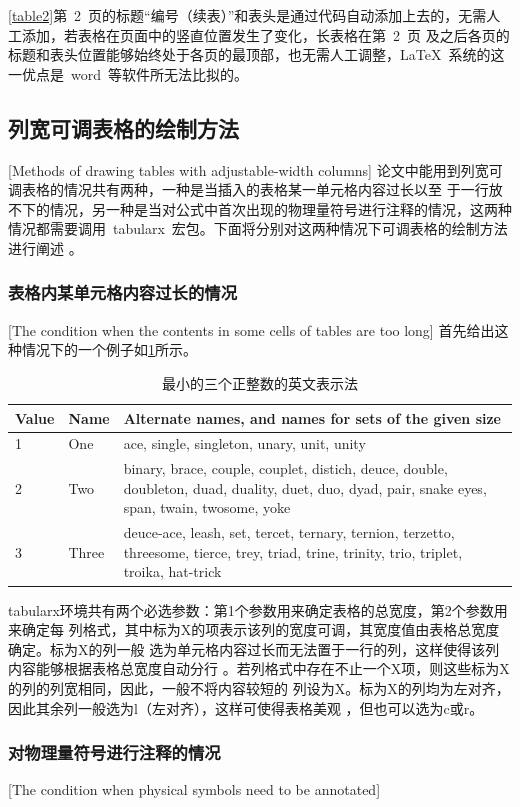 \cref{table2}第~2~页的标题“编号（续表）”和表头是通过代码自动添加上去的，无需人工添加，若表格在页面中的竖直位置发生了变化，长表格在第~2~页
及之后各页的标题和表头位置能够始终处于各页的最顶部，也无需人工调整，\LaTeX~系统的这一优点是~word~等软件所无法比拟的。

\subsection{列宽可调表格的绘制方法}[Methods of drawing tables with adjustable-width columns]
论文中能用到列宽可调表格的情况共有两种，一种是当插入的表格某一单元格内容过长以至
于一行放不下的情况，另一种是当对公式中首次出现的物理量符号进行注释的情况，这两种
情况都需要调用~tabularx~宏包。下面将分别对这两种情况下可调表格的绘制方法进行阐述
。
\subsubsection{表格内某单元格内容过长的情况}[The condition when the contents in
some cells of tables are too long]
首先给出这种情况下的一个例子如\cref{table3}所示。
\begin{table}[htbp]
  \centering
\caption{最小的三个正整数的英文表示法}\vspace{0.5em}\wuhao
\label{table3}
\begin{tabularx}{0.7\textwidth}{llX}
\toprule
Value & Name & Alternate names, and names for sets of the given size\\
\midrule
1 & One & ace, single, singleton, unary, unit, unity\\
2 & Two & binary, brace, couple, couplet, distich, deuce, double, doubleton, duad, duality, duet, duo, dyad, pair, snake eyes, span, twain, twosome, yoke\\
3 & Three & deuce-ace, leash, set, tercet, ternary, ternion, terzetto, threesome, tierce, trey, triad, trine, trinity, trio, triplet, troika, hat-trick\\
\bottomrule
\end{tabularx}
\end{table}
tabularx环境共有两个必选参数：第1个参数用来确定表格的总宽度，第2个参数用来确定每
列格式，其中标为X的项表示该列的宽度可调，其宽度值由表格总宽度确定。标为X的列一般
选为单元格内容过长而无法置于一行的列，这样使得该列内容能够根据表格总宽度自动分行
。若列格式中存在不止一个X项，则这些标为X的列的列宽相同，因此，一般不将内容较短的
列设为X。标为X的列均为左对齐，因此其余列一般选为l（左对齐），这样可使得表格美观
，但也可以选为c或r。

\subsubsection{对物理量符号进行注释的情况}[The condition when physical symbols
need to be annotated]

